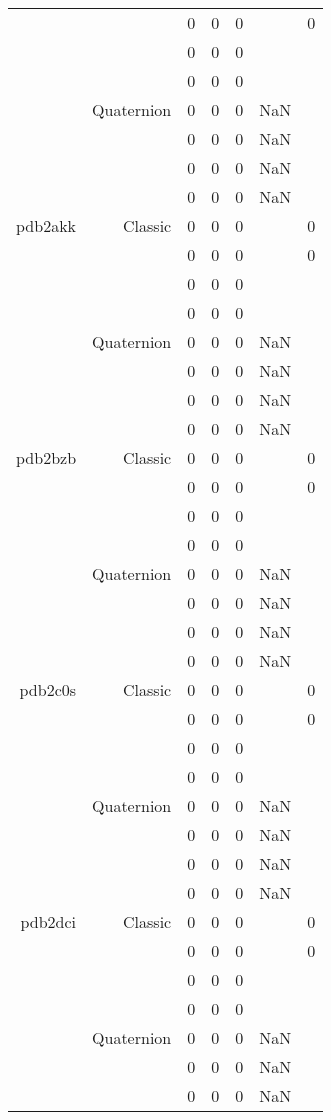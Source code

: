 \begin{xltabular}{\textwidth}{r|rcccSc}
& & 0 & 0 & 0 & & 0 \\
& & 0 & 0 & 0 & & \\
& & 0 & 0 & 0 & & \\
& Quaternion & 0 & 0 & 0 & NaN & \\
& & 0 & 0 & 0 & NaN & \\
& & 0 & 0 & 0 & NaN & \\
& & 0 & 0 & 0 & NaN & \\ \addlinespace
pdb2akk & Classic & 0 & 0 & 0 & & 0 \\
& & 0 & 0 & 0 & & 0 \\
& & 0 & 0 & 0 & & \\
& & 0 & 0 & 0 & & \\
& Quaternion & 0 & 0 & 0 & NaN & \\
& & 0 & 0 & 0 & NaN & \\
& & 0 & 0 & 0 & NaN & \\
& & 0 & 0 & 0 & NaN & \\ \addlinespace
pdb2bzb & Classic & 0 & 0 & 0 & & 0 \\
& & 0 & 0 & 0 & & 0 \\
& & 0 & 0 & 0 & & \\
& & 0 & 0 & 0 & & \\
& Quaternion & 0 & 0 & 0 & NaN & \\
& & 0 & 0 & 0 & NaN & \\
& & 0 & 0 & 0 & NaN & \\
& & 0 & 0 & 0 & NaN & \\ \addlinespace
pdb2c0s & Classic & 0 & 0 & 0 & & 0 \\
& & 0 & 0 & 0 & & 0 \\
& & 0 & 0 & 0 & & \\
& & 0 & 0 & 0 & & \\
& Quaternion & 0 & 0 & 0 & NaN & \\
& & 0 & 0 & 0 & NaN & \\
& & 0 & 0 & 0 & NaN & \\
& & 0 & 0 & 0 & NaN & \\ \addlinespace
pdb2dci & Classic & 0 & 0 & 0 & & 0 \\
& & 0 & 0 & 0 & & 0 \\
& & 0 & 0 & 0 & & \\
& & 0 & 0 & 0 & & \\
& Quaternion & 0 & 0 & 0 & NaN & \\
& & 0 & 0 & 0 & NaN & \\
& & 0 & 0 & 0 & NaN & \\

\end{xltabular}
